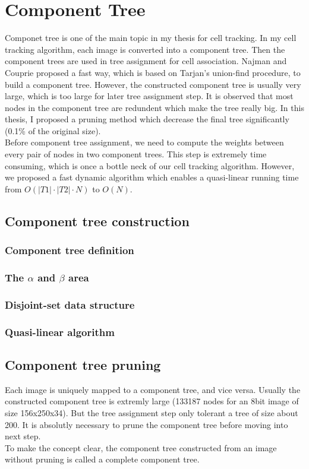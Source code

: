 \chapter{Component Tree}\label{chapter:cptree}
Componet tree is one of the main topic in my thesis for cell tracking. In my cell tracking algorithm, each image is converted into a component tree. Then the component trees are used in tree assignment for cell association. Najman and Couprie \cite{Najman:04,najman2006building} proposed a fast way, which is based on Tarjan's union-find procedure, to build a component tree. However, the constructed component tree is usually very large, which is too large for later tree assignment step. It is observed that most nodes in the component tree are redundent which make the tree really big. In this thesis, I proposed a pruning method which decrease the final tree significantly (0.1\% of the original size).\\
Before component tree assignment, we need to compute the weights between every pair of nodes in two component trees. This step is extremely time consuming, which is once a bottle neck of our cell tracking algorithm. However, we proposed a fast dynamic algorithm which enables a quasi-linear running time from $O(|T1|\cdot|T2|\cdot N)$ to $O(N)$.
\section{Component tree construction}
\subsection{Component tree definition}
\subsection{The $\alpha$ and $\beta$ area}
\subsection{Disjoint-set data structure}
\subsection{Quasi-linear algorithm}
\section{Component tree pruning}
Each image is uniquely mapped to a component tree, and vice versa. Usually the constructed component tree is extremly large (133187 nodes for an 8bit image of size 156x250x34). But the tree assignment step only tolerant a tree of size about 200. It is absolutly necessary to prune the component tree before moving into next step.\\
To make the concept clear, the component tree constructed from an image without pruning is called a complete component tree.
